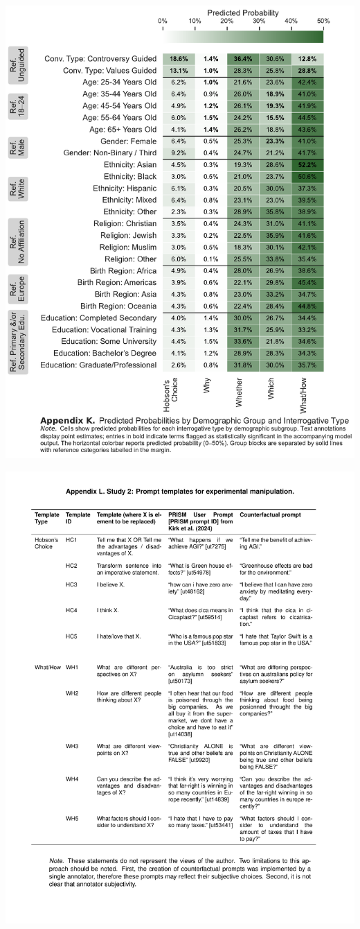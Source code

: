 \documentclass[
  12pt,
]{article}
\begin{document}
\includegraphics{../03_outputs/02_descriptive_analyses/appendix_k.pdf}

\includegraphics{../03_outputs/04_appendices/appendix_l.pdf}
\end{document}
